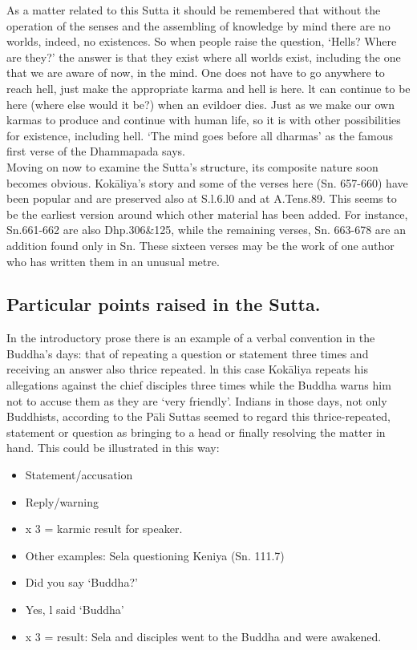 As a matter related to this Sutta it should be remembered that without the operation of the senses and the assembling of knowledge by mind there are no worlds, indeed, no existences. So when people raise the question, `Hells? Where are they?' the answer is that they exist where all worlds exist, including the one that we are aware of now, in the mind. One does not have to go anywhere to reach hell, just make the appropriate karma and hell is here. lt can continue to be here (where else would it be?) when an evildoer dies. Just as we make our own karmas to produce and continue with human life, so it is with other possibilities for existence, including hell. `The mind goes before all dharmas' as the famous first verse of the Dhammapada says.\\

Moving on now to examine the Sutta's structure, its composite nature soon becomes obvious. Kok\=aliya's story and some of the verses here (Sn. 657-660) have been popular and are preserved also at S.l.6.l0 and at A.Tens.89. This seems to be the earliest version around which other material has been added. For instance, Sn.661-662 are also Dhp.306\&125, while the remaining verses, Sn. 663-678 are an addition found only in Sn. These sixteen verses may be the work of one author who has written them in an unusual metre. 

\subsection{Particular points raised in the Sutta.}
In the introductory prose there is an example of a verbal convention in the Buddha's days: that of repeating a question or statement three times and receiving an answer also thrice repeated. ln this case Kok\=aliya repeats his allegations against the chief disciples three times while the Buddha warns him not to accuse them as they are `very friendly'. Indians in those days, not only Buddhists, according to the P\=ali Suttas seemed to regard this thrice-repeated, statement or question as bringing to a head or finally resolving the matter in hand. This could be illustrated in this way:

\begin{itemize}
\item   Statement/accusation
\item   Reply/warning
\item   x 3 = karmic result for speaker.
\item   Other examples: Sela questioning Keniya (Sn. 111.7)
\item   Did you say `Buddha?'
\item   Yes, l said `Buddha'
\item   x 3 = result: Sela and disciples went to the Buddha and were awakened.
\end{itemize}

